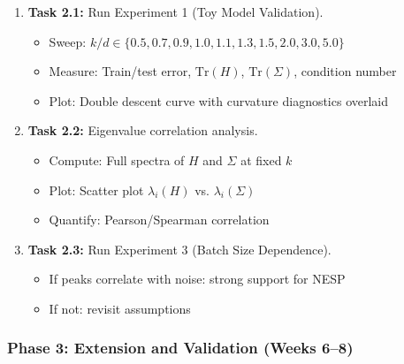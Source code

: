 \documentclass[
  journal=largetwo,
  year=2025,
  volume=37,
]{cup-journal}
\begin{document}
\begin{enumerate}
    \item[$\square$] \textbf{Task 2.1:} Run Experiment 1 (Toy Model Validation).
    \begin{itemize}
        \item Sweep: $k/d \in \{0.5, 0.7, 0.9, 1.0, 1.1, 1.3, 1.5, 2.0, 3.0, 5.0\}$
        \item Measure: Train/test error, $\text{Tr}(H)$, $\text{Tr}(\Sigma)$, condition number
        \item Plot: Double descent curve with curvature diagnostics overlaid
    \end{itemize}
    
    \item[$\square$] \textbf{Task 2.2:} Eigenvalue correlation analysis.
    \begin{itemize}
        \item Compute: Full spectra of $H$ and $\Sigma$ at fixed $k$
        \item Plot: Scatter plot $\lambda_i(H)$ vs. $\lambda_i(\Sigma)$
        \item Quantify: Pearson/Spearman correlation
    \end{itemize}
    
    \item[$\square$] \textbf{Task 2.3:} Run Experiment 3 (Batch Size Dependence).
    \begin{itemize}
        \item If peaks correlate with noise: strong support for NESP
        \item If not: revisit assumptions
    \end{itemize}
\end{enumerate}

\subsubsection{Phase 3: Extension and Validation (Weeks 6--8)}
\end{document}
